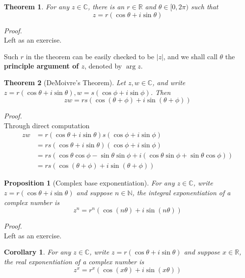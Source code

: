\documentclass[12pt]{article}
\newtheorem*{theorem}{Theorem}
\newtheorem*{corollary}{Corollary}
\newtheorem*{proposition}{Proposition}
\renewenvironment{proof}[1][Proof]{\begin{snugshade*} \textit{{#1}.}\\}{\hfill \qedsymbol \end{snugshade*}}
\begin{document}
    \begin{theorem}
        For any $z\in\mathbb{C}$, there is an $r\in\mathbb{R}$ and $\theta \in [0,2\pi)$ such that $$z=r(\cos{\theta}+i\sin{\theta})$$
    \end{theorem}

    \begin{proof}
        Left as an exercise.
    \end{proof}

    Such $r$ in the theorem can be easily checked to be $|z|$, and we shall call $\theta$ the \textbf{principle argument of $z$}, denoted by $\arg{z}$.

    \begin{theorem}[DeMoivre's Theorem]
        Let $z,w\in\mathbb{C}$, and write $z=r(\cos{\theta}+i\sin{\theta}),w=s(\cos{\phi}+i\sin{\phi})$. Then $$zw=rs(\cos(\theta+\phi)+i\sin(\theta+\phi))$$
    \end{theorem}

    \begin{proof}
        Through direct computation\begin{align*}
            zw&=r(\cos{\theta}+i\sin{\theta})s(\cos{\phi}+i\sin{\phi})\\
            &=rs(\cos{\theta}+i\sin{\theta})(\cos{\phi}+i\sin{\phi})\\
            &=rs(\cos{\theta}\cos{\phi}-\sin{\theta}\sin{\phi}+i(\cos{\theta}\sin{\phi}+\sin{\theta}\cos{\phi}))\\
            &=rs(\cos(\theta+\phi)+i\sin(\theta+\phi))
        \end{align*}
    \end{proof}

    \begin{proposition}[Complex base exponentiation]
        For any $z\in\mathbb{C}$, write $z=r(\cos{\theta}+i\sin{\theta})$ and suppose $n\in\mathbb{N}$, the integral exponentiation of a complex number is $$z^n=r^n(\cos(n\theta)+i\sin(n\theta))$$
    \end{proposition}

    \begin{proof}
        Left as an exercise.
    \end{proof}

    \begin{corollary}
        For any $z\in\mathbb{C}$, write $z=r(\cos{\theta}+i\sin{\theta})$ and suppose $x\in\mathbb{R}$, the real exponentiation of a complex number is $$z^x=r^x(\cos(x\theta)+i\sin(x\theta))$$
    \end{corollary}
\end{document}
